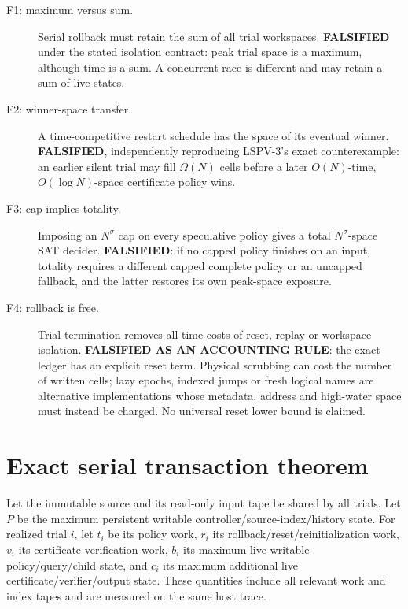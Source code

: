 \documentclass[11pt]{article}
\begin{document}
\begin{description}
\item[F1: maximum versus sum.] Serial rollback must retain the sum of all
trial workspaces.  \textbf{FALSIFIED} under the stated isolation contract:
peak trial space is a maximum, although time is a sum.  A concurrent race is
different and may retain a sum of live states.
\item[F2: winner-space transfer.] A time-competitive restart schedule has the
space of its eventual winner.  \textbf{FALSIFIED}, independently reproducing
LSPV-3's exact counterexample: an earlier silent trial may fill
$\Omega(N)$ cells before a later $O(N)$-time, $O(\log N)$-space certificate
policy wins.
\item[F3: cap implies totality.] Imposing an $N^\sigma$ cap on every
speculative policy gives a total $N^\sigma$-space SAT decider.
\textbf{FALSIFIED}: if no capped policy finishes on an input, totality requires
a different capped complete policy or an uncapped fallback, and the latter
restores its own peak-space exposure.
\item[F4: rollback is free.] Trial termination removes all time costs of
reset, replay or workspace isolation.  \textbf{FALSIFIED AS AN ACCOUNTING
RULE}: the exact ledger has an explicit reset term.  Physical scrubbing can
cost the number of written cells; lazy epochs, indexed jumps or fresh logical
names are alternative implementations whose metadata, address and high-water
space must instead be charged.  No universal reset lower bound is claimed.
\end{description}

\section{Exact serial transaction theorem}
Let the immutable source and its read-only input tape be shared by all trials.
Let $P$ be the maximum persistent writable controller/source-index/history
state.  For realized trial $i$, let $t_i$ be its policy work, $r_i$ its
rollback/reset/reinitialization work, $v_i$ its certificate-verification work,
$b_i$ its maximum live writable policy/query/child state, and $c_i$ its maximum
additional live certificate/verifier/output state.  These quantities include
all relevant work and index tapes and are measured on the same host trace.
\end{document}
